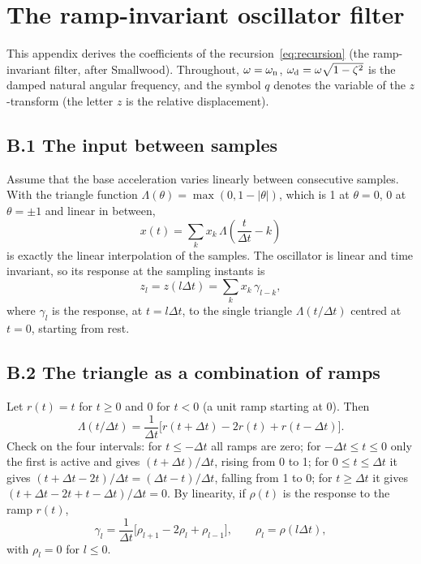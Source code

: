 \section{The ramp-invariant oscillator filter}\label{app:smallwood}

This appendix derives the coefficients of the recursion~\eqref{eq:recursion} (the ramp-invariant
filter, after Smallwood). Throughout, $\omega = \omega_{\mathrm{n}}$, $\omega_{\mathrm{d}} = \omega\sqrt{1-\zeta^2}$ is the damped
natural angular frequency, and the symbol $q$ denotes the variable of the $z$-transform (the letter $z$
is the relative displacement).

\subsection*{B.1 The input between samples}

Assume that the base acceleration varies linearly between consecutive samples. With the triangle
function $\Lambda(\theta) = \max(0,1-|\theta|)$, which is 1 at $\theta=0$, 0 at $\theta=\pm1$ and linear
in between,
\begin{equation}
  x(t) = \sum_k x_k\,\Lambda\!\left(\frac{t}{\Delta t}-k\right)
\end{equation}
is exactly the linear interpolation of the samples. The oscillator is linear and time invariant, so
its response at the sampling instants is
\begin{equation}\label{eq:B1}
  z_l = z(l\Delta t) = \sum_k x_k\,\gamma_{l-k},
\end{equation}
where $\gamma_l$ is the response, at $t = l\Delta t$, to the single triangle $\Lambda(t/\Delta t)$ centred
at $t=0$, starting from rest.

\subsection*{B.2 The triangle as a combination of ramps}

Let $r(t) = t$ for $t\ge0$ and $0$ for $t<0$ (a unit ramp starting at 0). Then
\begin{equation}
  \Lambda(t/\Delta t) = \frac{1}{\Delta t}\bigl[r(t+\Delta t) - 2r(t) + r(t-\Delta t)\bigr].
\end{equation}
Check on the four intervals: for $t\le-\Delta t$ all ramps are zero; for $-\Delta t\le t\le0$ only
the first is active and gives $(t+\Delta t)/\Delta t$, rising from 0 to 1; for $0\le t\le\Delta t$ it
gives $(t+\Delta t-2t)/\Delta t = (\Delta t-t)/\Delta t$, falling from 1 to 0; for $t\ge\Delta t$ it
gives $(t+\Delta t-2t+t-\Delta t)/\Delta t = 0$. By linearity, if $\rho(t)$ is the response to the ramp
$r(t)$,
\begin{equation}\label{eq:B2}
  \gamma_l = \frac{1}{\Delta t}\bigl[\rho_{l+1} - 2\rho_l + \rho_{l-1}\bigr],\qquad \rho_l = \rho(l\Delta t),
\end{equation}
with $\rho_l = 0$ for $l\le0$.

